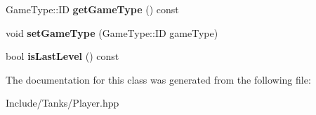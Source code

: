 \begin{DoxyCompactItemize}
\item 
\hypertarget{class_player_a3f7d04c87a0cb13bb3e2f7f089e4eb17}{}Game\+Type\+::\+I\+D {\bfseries get\+Game\+Type} () const \label{class_player_a3f7d04c87a0cb13bb3e2f7f089e4eb17}

\item 
\hypertarget{class_player_a81223a9d4b98e62b90ef8bc02eec0869}{}void {\bfseries set\+Game\+Type} (Game\+Type\+::\+I\+D game\+Type)\label{class_player_a81223a9d4b98e62b90ef8bc02eec0869}

\item 
\hypertarget{class_player_ac7df9fbb5d7fb969ed1b56fec334a376}{}bool {\bfseries is\+Last\+Level} () const \label{class_player_ac7df9fbb5d7fb969ed1b56fec334a376}

\end{DoxyCompactItemize}


The documentation for this class was generated from the following file\+:\begin{DoxyCompactItemize}
\item 
Include/\+Tanks/Player.\+hpp\end{DoxyCompactItemize}
